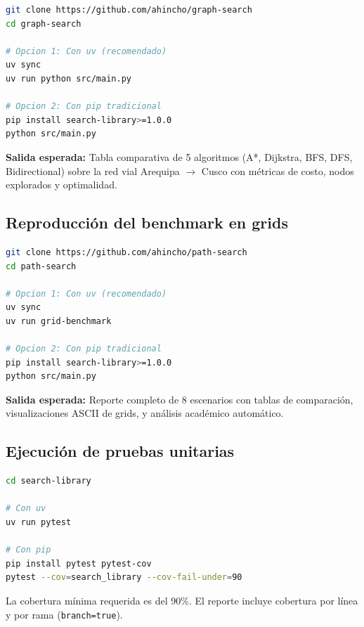 \begin{lstlisting}[language=bash, caption={Ejecución del benchmark de grafos}, label={lst:run_graph}]
git clone https://github.com/ahincho/graph-search
cd graph-search

# Opcion 1: Con uv (recomendado)
uv sync
uv run python src/main.py

# Opcion 2: Con pip tradicional
pip install search-library>=1.0.0
python src/main.py
\end{lstlisting}

\textbf{Salida esperada:} Tabla comparativa de 5 algoritmos (A*, Dijkstra, BFS, DFS, Bidirectional) sobre la red vial Arequipa $\rightarrow$ Cusco con métricas de costo, nodos explorados y optimalidad.

\subsection{Reproducción del benchmark en grids}

\begin{lstlisting}[language=bash, caption={Ejecución del benchmark de grids}, label={lst:run_grid}]
git clone https://github.com/ahincho/path-search
cd path-search

# Opcion 1: Con uv (recomendado)
uv sync
uv run grid-benchmark

# Opcion 2: Con pip tradicional
pip install search-library>=1.0.0
python src/main.py
\end{lstlisting}

\textbf{Salida esperada:} Reporte completo de 8 escenarios con tablas de comparación, visualizaciones ASCII de grids, y análisis académico automático.

\subsection{Ejecución de pruebas unitarias}

\begin{lstlisting}[language=bash, caption={Ejecución de tests en la librería core}, label={lst:tests}]
cd search-library

# Con uv
uv run pytest

# Con pip
pip install pytest pytest-cov
pytest --cov=search_library --cov-fail-under=90
\end{lstlisting}

La cobertura mínima requerida es del 90\%. El reporte incluye cobertura por línea y por rama (\texttt{branch=true}).

